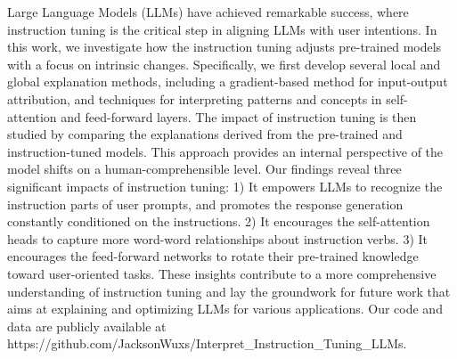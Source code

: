 Large Language Models (LLMs) have achieved remarkable success, where instruction tuning is the critical step in aligning LLMs with user intentions. In this work, we investigate how the instruction tuning adjusts pre-trained models with a focus on intrinsic changes. Specifically, we first develop several local and global explanation methods, including a gradient-based method for input-output attribution, and techniques for interpreting patterns and concepts in self-attention and feed-forward layers. The impact of instruction tuning is then studied by comparing the explanations derived from the pre-trained and instruction-tuned models. This approach provides an internal perspective of the model shifts on a human-comprehensible level. Our findings reveal three significant impacts of instruction tuning: 1) It empowers LLMs to recognize the instruction parts of user prompts, and promotes the response generation constantly conditioned on the instructions. 2) It encourages the self-attention heads to capture more word-word relationships about instruction verbs. 3) It encourages the feed-forward networks to rotate their pre-trained knowledge toward user-oriented tasks. These insights contribute to a more comprehensive understanding of instruction tuning and lay the groundwork for future work that aims at explaining and optimizing LLMs for various applications. Our code and data are publicly available at https://github.com/JacksonWuxs/Interpret\_Instruction\_Tuning\_LLMs.